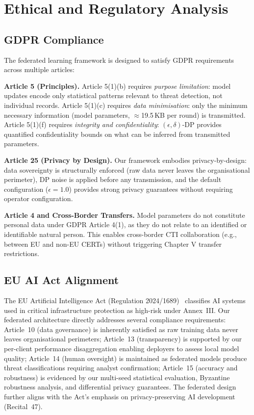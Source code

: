 \documentclass[conference]{IEEEtran}
\begin{document}
\section{Ethical and Regulatory Analysis}

\subsection{GDPR Compliance}

The federated learning framework is designed to satisfy GDPR
requirements across multiple articles:

\textbf{Article 5 (Principles).}
Article 5(1)(b) requires \emph{purpose limitation}: model updates
encode only statistical patterns relevant to threat detection, not
individual records.
Article 5(1)(c) requires \emph{data minimisation}: only the minimum
necessary information (model parameters, $\approx$19.5\,KB per round)
is transmitted.
Article 5(1)(f) requires \emph{integrity and confidentiality}:
$(\epsilon,\delta)$-DP provides quantified confidentiality bounds on
what can be inferred from transmitted parameters.

\textbf{Article 25 (Privacy by Design).}
Our framework embodies privacy-by-design: data sovereignty is
structurally enforced (raw data never leaves the organisational
perimeter), DP noise is applied before any transmission, and the
default configuration ($\epsilon=1.0$) provides strong privacy
guarantees without requiring operator configuration.

\textbf{Article 4 and Cross-Border Transfers.}
Model parameters do not constitute personal data under GDPR
Article 4(1), as they do not relate to an identified or identifiable
natural person.
This enables cross-border CTI collaboration (e.g., between EU and
non-EU CERTs) without triggering Chapter V transfer restrictions.

\subsection{EU AI Act Alignment}

The EU Artificial Intelligence Act (Regulation 2024/1689)~\cite{euaiact2024}
classifies AI systems used in critical infrastructure protection as
high-risk under Annex~III.
Our federated architecture directly addresses several compliance
requirements:
Article~10 (data governance) is inherently satisfied as raw training
data never leaves organisational perimeters;
Article~13 (transparency) is supported by our per-client performance
disaggregation enabling deployers to assess local model quality;
Article~14 (human oversight) is maintained as federated models produce
threat classifications requiring analyst confirmation;
Article~15 (accuracy and robustness) is evidenced by our multi-seed
statistical evaluation, Byzantine robustness analysis, and differential
privacy guarantees.
The federated design further aligns with the Act's emphasis on
privacy-preserving AI development (Recital~47).
\end{document}
